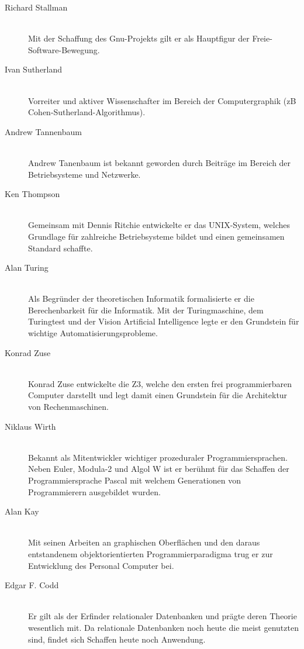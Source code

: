 \begin{description}
  \item[Richard Stallman ] \hfill{} \\
    Mit der Schaffung des Gnu-Projekts gilt er als Hauptfigur der Freie-Software-Bewegung.

  \item[Ivan Sutherland ] \hfill{} \\
    Vorreiter und aktiver Wissenschafter im Bereich der Computergraphik (zB Cohen-Sutherland-Algorithmus).

  \item[Andrew Tannenbaum ] \hfill{} \\
    Andrew Tanenbaum ist bekannt geworden durch Beiträge im Bereich der Betriebsysteme und Netzwerke.

  \item[Ken Thompson ] \hfill{} \\
   Gemeinsam mit Dennis Ritchie entwickelte er das UNIX-System, welches Grundlage für zahlreiche Betriebsysteme bildet und einen gemeinsamen Standard schaffte.

  \item[Alan Turing ] \hfill{} \\
   Als Begründer der theoretischen Informatik formalisierte er die Berechenbarkeit für die Informatik. Mit der Turingmaschine, dem Turingtest und der Vision Artificial Intelligence legte er den Grundstein für wichtige Automatisierungsprobleme.

  \item[Konrad Zuse ] \hfill{} \\
   Konrad Zuse entwickelte die Z3, welche den ersten frei programmierbaren Computer darstellt und legt damit einen Grundstein für die Architektur von Rechenmaschinen.

  \item[Niklaus Wirth ] \hfill{} \\
   Bekannt als Mitentwickler wichtiger prozeduraler Programmiersprachen. Neben Euler, Modula-2 und Algol W ist er berühmt für das Schaffen der Programmiersprache Pascal mit welchem Generationen von Programmierern ausgebildet wurden.

  \item[Alan Kay ] \hfill{} \\
   Mit seinen Arbeiten an graphischen Oberflächen und den daraus entstandenem objektorientierten Programmierparadigma trug er zur Entwicklung des Personal Computer bei.

  \item[Edgar F. Codd ] \hfill{} \\
   Er gilt als der Erfinder relationaler Datenbanken und prägte deren Theorie wesentlich mit. Da relationale Datenbanken noch heute die meist genutzten sind, findet sich Schaffen heute noch Anwendung.
\end{description}
